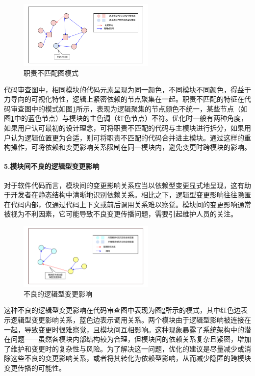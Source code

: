 \begin{figure}[h]
\centering
\includegraphics[width = 0.6\textwidth]{figures/职责不匹配_2.pdf}
\caption{职责不匹配图模式}
\label{1_职责不匹配图模式}
\end{figure}

代码审查图中，相同模块的代码元素呈现为同一颜色，不同模块不同颜色，得益于力导向的可视化特性，逻辑上紧密依赖的节点聚集在一起。职责不匹配的特征在代码审查图中的模式如图\ref{1_职责不匹配图模式}所示，表现为逻辑聚集的节点颜色不统一，某些节点（如图\ref{1_职责不匹配图模式}中的蓝色节点）与模块的主色调（红色节点）不符。优化时一般有两种角度，如果用户认可最初的设计理念，可将职责不匹配的代码与主模块进行拆分，如果用户认为逻辑位置更为合适，则可将职责不匹配的代码合并进主模块。通过这样的重构操作，可将依赖和变更影响关系限制在同一模块内，避免变更时跨模块的影响。


\paragraph{5.模块间不良的逻辑型变更影响} 对于软件代码而言，模块间的变更影响关系应当以依赖型变更显式地呈现，这有助于开发者在静态结构中清晰地识别依赖关系。相比之下，逻辑型变更影响往往隐匿在代码内部，仅通过代码上下文或前后调用关系难以察觉。模块间的变更影响通常被视为不利因素，它可能导致不良变更传播问题，需要引起维护人员的关注。

\begin{figure}[h]
\centering
\includegraphics[width = 0.6\textwidth]{figures/不良变更影响_2.pdf}
\caption{不良的逻辑型变更影响}
\label{1_不良的逻辑型变更影响}
\end{figure}


这种不良的逻辑型变更影响在代码审查图中表现为图\ref{1_不良的逻辑型变更影响}所示的模式，其中红色边表示逻辑型变更影响关系，蓝色边表示调用关系。两个模块由于逻辑型影响被连接在一起，导致变更时很难察觉，且模块间互相影响。这种现象暴露了系统架构中的潜在问题——虽然各模块内部结构较为合理，但模块间的依赖关系复杂且紧密，增加了维护和变更时的复杂性与风险。为了解决这一问题，优化的建议是尽量减少或消除这些不良的变更影响关系，或者将其转化为依赖型影响，从而减少隐匿的跨模块变更传播的可能性。

